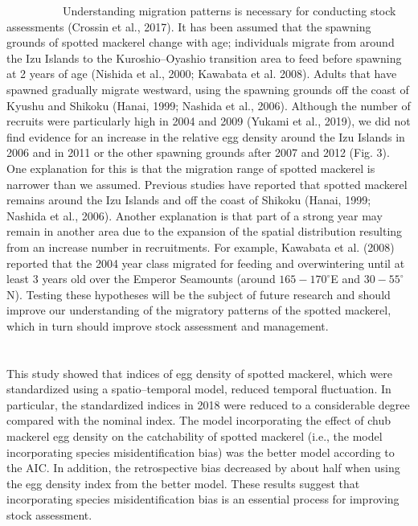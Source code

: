 \documentclass[12pt]{article}
\begin{document}
\begin{linenumbers}
\ \ \ \ \ \ \ \ \ \
Understanding migration patterns is necessary for conducting stock assessments (Crossin et al., 2017). It has been assumed that the spawning grounds of spotted mackerel change with age; individuals migrate from around the Izu Islands to the Kuroshio--Oyashio transition area to feed before spawning at 2 years of age (Nishida et al., 2000; Kawabata et al. 2008). Adults that have spawned gradually migrate westward, using the spawning grounds off the coast of Kyushu and Shikoku (Hanai, 1999; Nashida et al., 2006). Although the number of recruits were particularly high in 2004 and 2009 (Yukami et al., 2019), we did not find evidence for an increase in the relative egg density around the Izu Islands in 2006 and in 2011 or the other spawning grounds after 2007 and 2012 (Fig. 3). One explanation for this is that the migration range of spotted mackerel is narrower than we assumed. Previous studies have reported that spotted mackerel remains around the Izu Islands and off the coast of Shikoku (Hanai, 1999; Nashida et al., 2006). Another explanation is that part of a strong year may remain in another area due to the expansion of the spatial distribution resulting from an increase number in recruitments. For example, Kawabata et al. (2008) reported that the 2004 year class migrated for feeding and overwintering until at least 3 years old over the Emperor Seamounts (around $\textrm{165}-\textrm{170}^{\circ}$E and $\textrm{30}-\textrm{55}^{\circ}$N). Testing these hypotheses will be the subject of future research and should improve our understanding of the migratory patterns of the spotted mackerel, which in turn should improve stock assessment and management.
\ \\

\ \\
\\
This study showed that indices of egg density of spotted mackerel, which were standardized using a spatio--temporal model, reduced temporal fluctuation. In particular, the standardized indices in 2018 were reduced to a considerable degree compared with the nominal index. The model incorporating the effect of chub mackerel egg density on the catchability of spotted mackerel (i.e., the model incorporating species misidentification bias) was the better model according to the AIC. In addition, the retrospective bias decreased by about half when using the egg density index from the better model. These results suggest that incorporating species misidentification bias is an essential process for improving stock assessment.


\end{linenumbers}
\end{document}

